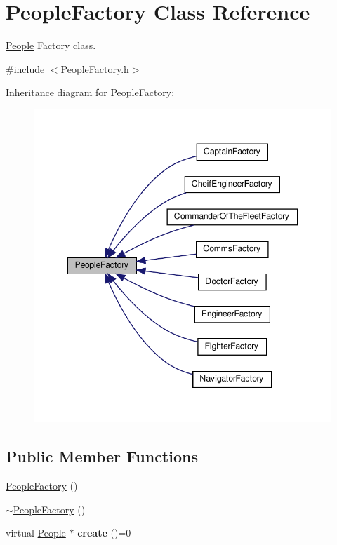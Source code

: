 \hypertarget{classPeopleFactory}{}\section{People\+Factory Class Reference}
\label{classPeopleFactory}


\hyperlink{classPeople}{People} Factory class.  




{\ttfamily \#include $<$People\+Factory.\+h$>$}



Inheritance diagram for People\+Factory\+:\nopagebreak
\begin{figure}[H]
\begin{center}
\leavevmode
\includegraphics[width=348pt]{classPeopleFactory__inherit__graph}
\end{center}
\end{figure}
\subsection*{Public Member Functions}
\begin{DoxyCompactItemize}
\item 
\hyperlink{classPeopleFactory_a937ce020364a355d6689c365ba70f0d6}{People\+Factory} ()
\item 
\hyperlink{classPeopleFactory_a18d1aec526ba93ca84cde1c25cfb8944}{$\sim$\+People\+Factory} ()
\item 
\mbox{\label{classPeopleFactory_a2a61d6ec85c72d8b1c28752609e60d10}} 
virtual \hyperlink{classPeople}{People} $\ast$ {\bfseries create} ()=0
\end{DoxyCompactItemize}


